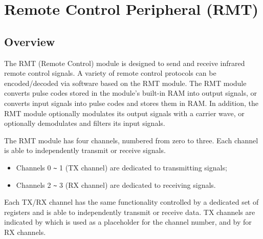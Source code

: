 \documentclass[main\_\_EN.tex]{subfiles}
\begin{document}

\ifglobal
\else
    {\let\clearpage\relax \listoftodos}
    {\let\clearpage\relax \listofdonetodos}
    \tableofcontents
\fi



\hypertarget{rmt}{}
\chapter{Remote Control Peripheral (RMT)}
\label{mod:rmt}


\section{Overview}
The RMT (Remote Control) module is designed to send and receive infrared remote control signals. A variety of remote control protocols can be encoded/decoded via software based on the RMT module. The RMT module converts pulse codes stored in the module’s built-in RAM into output signals, or converts input signals into pulse codes and stores them in RAM. In addition, the RMT module optionally modulates its output signals with a carrier wave, or optionally demodulates and filters its input signals.

The RMT module has four channels, numbered from zero to three. Each channel is able to independently transmit or receive signals.
\begin{itemize}
    \item Channels 0 \verb+~+ 1 (TX channel) are dedicated to transmitting signals;
    \item Channels 2 \verb+~+ 3 (RX channel) are dedicated to receiving signals.
\end{itemize}

Each TX/RX channel has the same functionality controlled by a dedicated set of registers and is able to independently transmit or receive data. TX channels are indicated by  which is used as a placeholder for the channel number, and by  for RX channels.
\end{document}
